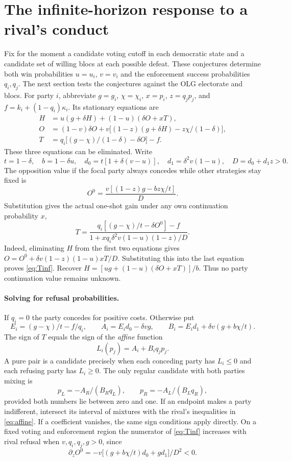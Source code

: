 \documentclass[11pt,letterpaper]{article}
\begin{document}
\newpage
\section{The infinite-horizon response to a rival's conduct}\label{sec:infinite}
Fix for the moment a candidate voting cutoff in each democratic state and a candidate set of willing blocs at each possible defeat. These conjectures determine both win probabilities \(u=u_i\), \(v=v_i\) and the enforcement success probabilities \(q_i,q_j\). The next section tests the conjectures against the OLG electorate and blocs. For party \(i\), abbreviate \(g=g_i\), \(\chi=\chi_i\), \(x=p_i\), \(z=q_jp_j\), and \(f=k_i+(1-q_i)\kappa_i\). Its stationary equations are
\begin{align*}
 H&=u(g+\delta H)+(1-u)(\delta O+xT),\\
 O&=(1-v)\delta O+v\big[(1-z)(g+\delta H)-z\chi/(1-\delta)\big],\\
 T&=q_i\big[(g-\chi)/(1-\delta)-\delta O\big]-f .
\end{align*}
These three equations can be eliminated. Write
\[
 t=1-\delta,\quad b=1-\delta u,\quad
 d_0=t[1+\delta(v-u)],\quad d_1=\delta^2v(1-u),\quad D=d_0+d_1 z>0.
\]
The opposition value if the focal party always concedes while other strategies stay fixed is
\[
 O^0=\frac{v[(1-z)g-bz\chi/t]}{D}.
\]
Substitution gives the actual one-shot gain under any own continuation probability \(x\),
\begin{equation}
 T=\frac{q_i[(g-\chi)/t-\delta O^0]-f}
          {1+xq_i\delta^2v(1-u)(1-z)/D}.\label{eq:Tinf}
\end{equation}
Indeed, eliminating \(H\) from the first two equations gives \(O=O^0+\delta v(1-z)(1-u)xT/D\). Substituting this into the last equation proves \eqref{eq:Tinf}. Recover \(H=[ug+(1-u)(\delta O+xT)]/b\). Thus no party continuation value remains unknown.

\paragraph{Solving for refusal probabilities.}
If \(q_i=0\) the party concedes for positive costs. Otherwise put
\[
 E_i=(g-\chi)/t-f/q_i,\qquad
 A_i=E_i d_0-\delta vg,\qquad B_i=E_i d_1+\delta v(g+b\chi/t).
\]
The sign of \(T\) equals the sign of the \emph{affine} function
\begin{equation}
 L_i(p_j)=A_i+B_iq_jp_j .\label{eq:affine}
\end{equation}
A pure pair is a candidate precisely when each conceding party has \(L_i\le0\) and each refusing party has \(L_i\ge0\). The only regular candidate with both parties mixing is
\[
 p_L=-A_R/(B_Rq_L),\qquad p_R=-A_L/(B_Lq_R),
\]
provided both numbers lie between zero and one. If an endpoint makes a party indifferent, intersect its interval of mixtures with the rival's inequalities in \eqref{eq:affine}. If a coefficient vanishes, the same sign conditions apply directly. On a fixed voting and enforcement region the numerator of \eqref{eq:Tinf} increases with rival refusal when \(v,q_i,q_j,g>0\), since
\[
 \partial_z O^0=-v\big[(g+b\chi/t)d_0+g d_1\big]/D^2<0.
\]
\end{document}
